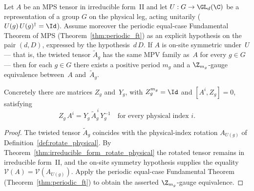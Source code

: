 \begin{theorem}%
    \label{cor:cor_4_1_physical_symmetry_zgauge}
    \leanok
    Let $A$ be an MPS tensor in irreducible form~II and let
    $U : G \to \GL_d(\C)$ be a representation of a group $G$ on the
    physical leg, acting unitarily ($U(g)\, U(g)^{\dagger} = \Id$).
    Assume moreover the periodic equal-case Fundamental Theorem of MPS
    (Theorem~\ref{thm:periodic_ft}) as an explicit hypothesis on the
    pair $(d, D)$, expressed by the hypothesis
    \,$d\,D$.
    If $A$ is on-site symmetric under~$U$ — that is, the twisted tensor
    $\widetilde{A}_g$ has the same MPV family as~$A$ for every $g \in G$
    — then for each $g \in G$ there exists a positive period $m_g$ and
    a $\Z_{m_g}$-gauge equivalence between~$A$ and~$\widetilde{A}_g$.

    Concretely there are matrices $Z_g$ and~$Y_g$, with $Z_g^{m_g} = \Id$
    and $[A^i, Z_g] = 0$, satisfying
    \[
        Z_g\, A^i = Y_g\, \widetilde{A}_g^{\,i}\, Y_g^{-1}
        \quad\text{for every physical index } i.
    \]
\end{theorem}

\begin{proof}\leanok
    The twisted tensor $\widetilde{A}_g$ coincides with the physical-index
    rotation $A_{U(g)}$ of Definition~\ref{def:rotate_physical}.
    By Theorem~\ref{thm:irreducible_form_rotate_physical} the rotated
    tensor remains in irreducible form~II, and the on-site symmetry
    hypothesis supplies the equality $\mathcal{V}(A) = \mathcal{V}(A_{U(g)})$.
    Apply the periodic equal-case Fundamental Theorem
    (Theorem~\ref{thm:periodic_ft}) to obtain the asserted
    $\Z_{m_g}$-gauge equivalence.
\end{proof}

